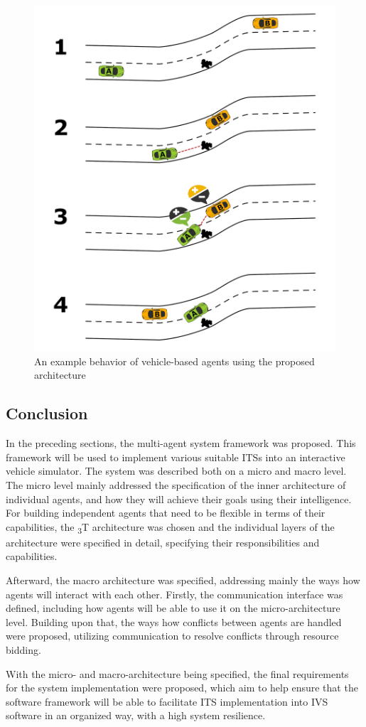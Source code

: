 \documentclass[main.tex]{subfiles}
\begin{document}
\begin{figure}[htbp]
    \centering
    \includegraphics[width=.8\textwidth]{AgentPlanning.png}
    \caption{An example behavior of vehicle-based agents using the proposed architecture}
    \label{agentReplanning}
\end{figure}


\subsection{Conclusion}

In the preceding sections, the multi-agent system framework was proposed. This framework will be used to implement various 
suitable ITSs into an interactive vehicle simulator. The system was described both on a micro and macro level. The micro level 
mainly addressed the specification of the inner architecture of individual agents, and how they will achieve their goals using their 
intelligence. For building independent agents that need to be flexible in terms of their capabilities, the \textsubscript{3}T
architecture was chosen and the individual layers of the architecture were specified in detail, specifying their responsibilities
and capabilities. 

Afterward, the macro architecture was specified, addressing mainly the ways how agents will interact with each other. 
Firstly, the communication interface was defined, including how agents will be able to use it on the micro-architecture level.
Building upon that, the ways how conflicts between agents are handled were proposed, utilizing communication to resolve 
conflicts through resource bidding. 

With the micro- and macro-architecture being specified, the final requirements for the system implementation were proposed, 
which aim to help ensure that the software framework will be able to facilitate ITS implementation into IVS software in an 
organized way, with a high system resilience.

\clearpage
\end{document}

